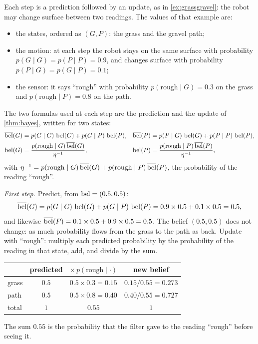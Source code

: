  Each step is a prediction followed by an update, as in
\cref{ex:grassgravel}: the robot may change surface between two readings.
The values of that example are:
\begin{itemize}[nosep]
  \item the states, ordered as $(G,P)$: the grass and the gravel path;
  \item the motion: at each step the robot stays on the same surface with
        probability $p(G\mid G)=p(P\mid P)=0.9$, and changes surface with
        probability $p(P\mid G)=p(G\mid P)=0.1$;
  \item the sensor: it says ``rough'' with probability
        $p(\text{rough}\mid G)=0.3$ on the grass and
        $p(\text{rough}\mid P)=0.8$ on the path.
\end{itemize}
The two formulas used at each step are the prediction and the update of
\cref{thm:bayes}, written for two states:
\begin{align*}
  \overline{\operatorname{bel}}(G)&=p(G\mid G)\,\operatorname{bel}(G)+p(G\mid P)\,\operatorname{bel}(P),
  &\overline{\operatorname{bel}}(P)&=p(P\mid G)\,\operatorname{bel}(G)+p(P\mid P)\,\operatorname{bel}(P),\\
  \operatorname{bel}(G)&=\frac{p(\text{rough}\mid G)\,\overline{\operatorname{bel}}(G)}{\eta^{-1}},
  &\operatorname{bel}(P)&=\frac{p(\text{rough}\mid P)\,\overline{\operatorname{bel}}(P)}{\eta^{-1}},
\end{align*}
with $\eta^{-1}=p(\text{rough}\mid G)\,\overline{\operatorname{bel}}(G)+p(\text{rough}\mid
P)\,\overline{\operatorname{bel}}(P)$, the probability of the reading ``rough''.

\emph{First step.} Predict, from $\operatorname{bel}=(0.5,0.5)$:
\[
  \overline{\operatorname{bel}}(G)=p(G\mid G)\,\operatorname{bel}(G)+p(G\mid P)\,\operatorname{bel}(P)
  =0.9\times0.5+0.1\times0.5=0.5,
\]
and likewise $\overline{\operatorname{bel}}(P)=0.1\times0.5+0.9\times0.5=0.5$. The belief
$(0.5,0.5)$ does not change: as much probability flows from the grass to
the path as back. Update with ``rough'': multiply each predicted
probability by the probability of the reading in that state, add, and
divide by the sum.
\begin{center}
\begin{tabular}{lccc}
  \toprule
  & predicted & $\times\,p(\text{rough}\mid\cdot)$ & new belief\\
  \midrule
  grass & $0.5$ & $0.5\times0.3=0.15$ & $0.15/0.55=0.273$\\
  path  & $0.5$ & $0.5\times0.8=0.40$ & $0.40/0.55=0.727$\\
  \midrule
  total & $1$ & $0.55$ & $1$\\
  \bottomrule
\end{tabular}
\end{center}
The sum $0.55$ is the probability that the filter gave to the reading
``rough'' before seeing it.

